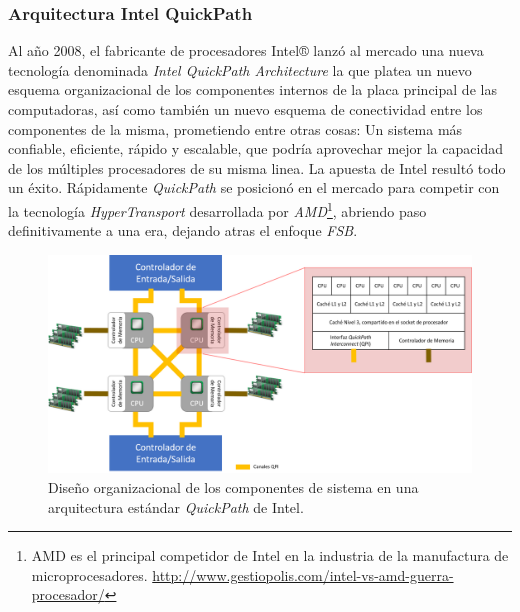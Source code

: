 \subsubsection{Arquitectura Intel QuickPath}
Al año 2008, el fabricante de procesadores Intel® lanzó al mercado una nueva tecnología denominada \emph{Intel QuickPath Architecture} \cite{paper:quickpath} la que platea un nuevo esquema organizacional de los componentes internos de la placa principal de las computadoras, así como también un nuevo esquema de conectividad entre los componentes de la misma, prometiendo entre otras cosas: Un sistema más confiable, eficiente, rápido y escalable, que podría aprovechar mejor la capacidad de los múltiples procesadores de su misma linea. La apuesta de Intel resultó todo un éxito. Rápidamente \emph{QuickPath} se posicionó en el mercado para competir con la tecnología \emph{HyperTransport} desarrollada por \emph{AMD}\footnote{AMD es el principal competidor de Intel en la industria de la manufactura de microprocesadores. \url{http://www.gestiopolis.com/intel-vs-amd-guerra-procesador/}}, abriendo paso definitivamente a una era, dejando atras el enfoque \emph{FSB}.

\begin{figure}[!h]
	\centering
	\includegraphics[scale=.5]{imagenes/quickpath2.png}
	\caption{Diseño organizacional de los componentes de sistema en una arquitectura estándar \emph{QuickPath} de Intel.}
	\label{fig:quickpath}
\end{figure}

